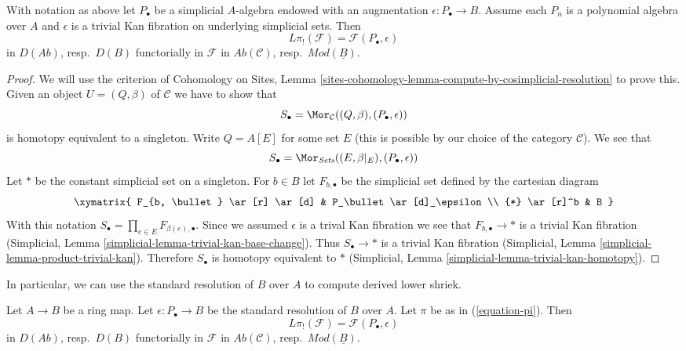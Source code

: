 \begin{lemma}
\label{lemma-identify-pi-shriek}
With notation as above let $P_\bullet$ be a simplicial $A$-algebra
endowed with an augmentation $\epsilon : P_\bullet \to B$.
Assume each $P_n$ is a polynomial algebra over $A$ and $\epsilon$
is a trivial Kan fibration on underlying simplicial sets. Then
$$
L\pi_!(\mathcal{F}) = \mathcal{F}(P_\bullet, \epsilon)
$$
in $D(\textit{Ab})$, resp.\ $D(B)$ functorially in $\mathcal{F}$ in
$\textit{Ab}(\mathcal{C})$, resp.\ $\textit{Mod}(\underline{B})$.
\end{lemma}

\begin{proof}
We will use the criterion of Cohomology on Sites, Lemma
\ref{sites-cohomology-lemma-compute-by-cosimplicial-resolution} to prove this.
Given an object $U = (Q, \beta)$ of $\mathcal{C}$ we have to show that
$$
S_\bullet = \Mor_\mathcal{C}((Q, \beta), (P_\bullet, \epsilon))
$$
is homotopy equivalent to a singleton.
Write $Q = A[E]$ for some set $E$ (this is possible by our choice of
the category $\mathcal{C}$). We see that
$$
S_\bullet = \Mor_{\textit{Sets}}((E, \beta|_E), (P_\bullet, \epsilon))
$$
Let $*$ be the constant simplicial set on a singleton. For $b \in B$
let $F_{b, \bullet}$ be the simplicial set defined by the cartesian
diagram
$$
\xymatrix{
F_{b, \bullet} \ar[r] \ar[d] & P_\bullet \ar[d]_\epsilon \\
{*} \ar[r]^b & B
}
$$
With this notation $S_\bullet = \prod_{e \in E} F_{\beta(e), \bullet}$.
Since we assumed $\epsilon$ is a trival Kan fibration we see that
$F_{b, \bullet} \to *$ is a trivial Kan fibration
(Simplicial, Lemma \ref{simplicial-lemma-trivial-kan-base-change}).
Thus $S_\bullet \to *$ is a trivial Kan fibration
(Simplicial, Lemma \ref{simplicial-lemma-product-trivial-kan}).
Therefore $S_\bullet$ is homotopy equivalent to $*$
(Simplicial, Lemma \ref{simplicial-lemma-trivial-kan-homotopy}).
\end{proof}

\noindent
In particular, we can use the standard resolution of $B$ over $A$
to compute derived lower shriek.

\begin{lemma}
\label{lemma-pi-shriek-standard}
Let $A \to B$ be a ring map. Let $\epsilon : P_\bullet \to B$
be the standard resolution of $B$ over $A$. Let $\pi$ be as in
(\ref{equation-pi}). Then
$$
L\pi_!(\mathcal{F}) = \mathcal{F}(P_\bullet, \epsilon)
$$
in $D(\textit{Ab})$, resp.\ $D(B)$ functorially in $\mathcal{F}$ in
$\textit{Ab}(\mathcal{C})$, resp.\ $\textit{Mod}(\underline{B})$.
\end{lemma}

